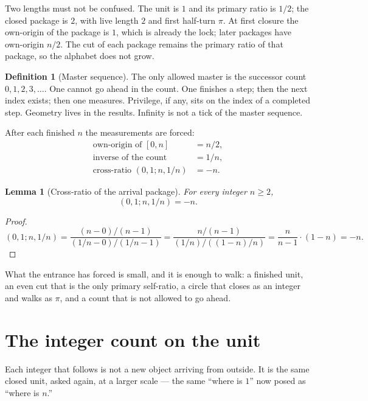 \documentclass[10pt,a4paper]{article}
\theoremstyle{plain}
\newtheorem{lemma}{Lemma}
\theoremstyle{definition}
\newtheorem{definition}{Definition}
\theoremstyle{remark}
\begin{document}
Two lengths must not be confused.
The unit is \(1\) and its primary ratio is \(1/2\); the closed package is \(2\), with live length \(2\) and first half-turn \(\pi\).
At first closure the own-origin of the package is \(1\), which is already the lock; later packages have own-origin \(n/2\).
The cut of each package remains the primary ratio of that package, so the alphabet does not grow.

\begin{definition}[Master sequence]
The only allowed master is the successor count \(0,1,2,3,\ldots\).
One cannot go ahead in the count.
One finishes a step; then the next index exists; then one measures.
Privilege, if any, sits on the index of a completed step.
Geometry lives in the results.
Infinity is not a tick of the master sequence.
\end{definition}

After each finished \(n\) the measurements are forced:
\begin{align*}
\text{own-origin of }[0,n] &= n/2,\\
\text{inverse of the count} &= 1/n,\\
\text{cross-ratio }(0,1;n,1/n) &= -n.
\end{align*}

\begin{lemma}[Cross-ratio of the arrival package]
For every integer \(n\ge 2\),
\[
(0,1;n,1/n)=-n.
\]
\end{lemma}

\begin{proof}
\[
(0,1;n,1/n)
=\frac{(n-0)/(n-1)}{(1/n-0)/(1/n-1)}
=\frac{n/(n-1)}{(1/n)/((1-n)/n)}
=\frac{n}{n-1}\cdot(1-n)
=-n.
\]
\end{proof}

What the entrance has forced is small, and it is enough to walk: a finished unit, an even cut that is the only primary self-ratio, a circle that closes as an integer and walks as \(\pi\), and a count that is not allowed to go ahead.

\section{The integer count on the unit}

Each integer that follows is not a new object arriving from outside.
It is the same closed unit, asked again, at a larger scale --- the same ``where is \(1\)'' now posed as ``where is \(n\).''
\end{document}
